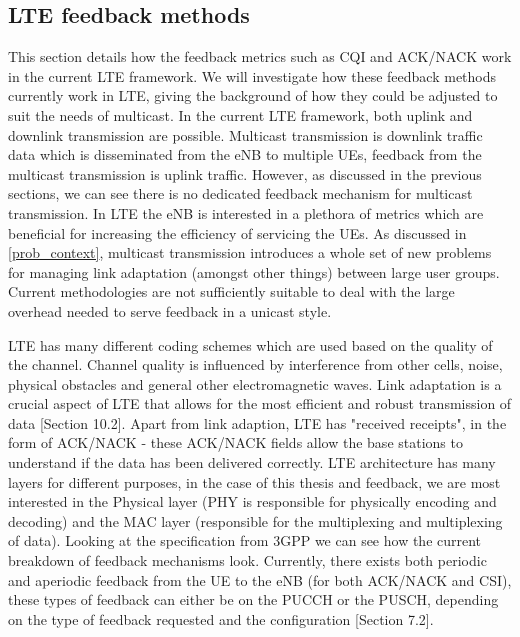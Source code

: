 \documentclass{article}
\begin{document}
\subsection{LTE feedback methods}\label{lte_feedback_current}



This section details how the feedback metrics such as \ac{CQI} and ACK/NACK work in the current LTE framework. We will investigate how these feedback methods currently work in LTE, giving the background of how they could be adjusted to suit the needs of multicast. In the current LTE framework, both uplink and downlink transmission are possible. Multicast transmission is downlink traffic data which is disseminated from the eNB to multiple UEs, feedback from the multicast transmission is uplink traffic. However, as discussed in the previous sections, we can see there is no dedicated feedback mechanism for multicast transmission. In LTE the eNB is interested in a plethora of metrics which are beneficial for increasing the efficiency of servicing the UEs. As discussed in \cref{prob_context}, multicast transmission introduces a whole set of new problems for managing link adaptation (amongst other things) between large user groups. Current methodologies are not sufficiently suitable to deal with the large overhead needed to serve feedback in a unicast style.

LTE has many different coding schemes which are used based on the quality of the channel. Channel quality is influenced by interference from other cells, noise,  physical obstacles and general other electromagnetic waves.  Link adaptation is a crucial aspect of LTE that allows for the most efficient and robust transmission of data \cite{umts_sesia}[Section 10.2]. Apart from link adaption, LTE has "received receipts", in the form of ACK/NACK - these ACK/NACK fields allow the base stations to understand if the data has been delivered correctly. LTE architecture has many layers for different purposes, in the case of this thesis and feedback, we are most interested in the Physical layer (PHY is responsible for physically encoding and decoding) and the MAC layer (responsible for the multiplexing and multiplexing of data). Looking at the specification from 3GPP we can see how the current breakdown of feedback mechanisms look. Currently, there exists both periodic and aperiodic feedback from the UE to the eNB (for both ACK/NACK and CSI), these types of feedback can either be on the PUCCH or the PUSCH, depending on the type of feedback requested and the configuration \cite{ETSITS136213}[Section 7.2]. 
\end{document}
